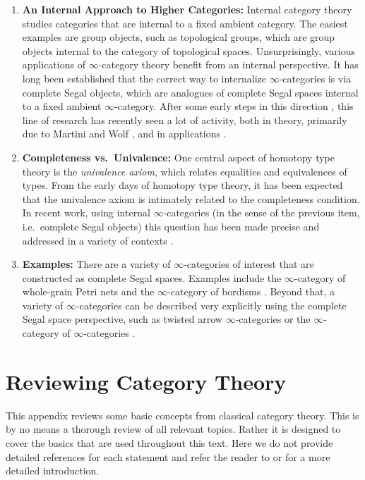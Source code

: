 \documentclass[11pt, a4paper]{amsart}
\theoremstyle{definition}
\theoremstyle{remark}
\numberwithin{equation}{section}
\begin{document}
\begin{enumerate}[leftmargin=*]
  \item \textbf{An Internal Approach to Higher Categories:} Internal category theory studies categories that are internal to a fixed ambient category. The easiest examples are group objects, such as topological groups, which are group objects internal to the category of topological spaces. Unsurprisingly, various applications of $\infty$-category theory benefit from an internal perspective. It has long been established that the correct way to internalize $\infty$-categories is via complete Segal objects, which are analogues of complete Segal spaces internal to a fixed ambient $\infty$-category. After some early steps in this direction \cite{rasekh2018cso,rasekh2022cartesian}, this line of research has recently seen a lot of activity, both in theory, primarily due to Martini and Wolf \cite{martiniwolf2024colimits,martini2021yonedainternal,martini2022cartfibinternal,martiniwolf2022presentability,martiniwolf2023internalhighertopos}, and in applications \cite{wolf2022proetale,stenzel2025comprehension}.     
  \item \textbf{Completeness vs.~Univalence:} One central aspect of homotopy type theory is the \emph{univalence axiom}, which relates equalities and equivalences of types. From the early days of homotopy type theory, it has been expected that the univalence axiom is intimately related to the completeness condition. In recent work, using internal $\infty$-categories (in the sense of the previous item, i.e.~complete Segal objects) this question has been made precise and addressed in a variety of contexts \cite{rasekh2021univalence,stenzel2023univalence}.
  \item \textbf{Examples:} There are a variety of $\infty$-categories of interest that are constructed as complete Segal spaces. Examples include the $\infty$-category of whole-grain Petri nets \cite{kock2023wholegrainpetri} and the $\infty$-category of bordisms \cite{lurie2009cobordism,calaquescheimbauer2019cobordism}. Beyond that, a variety of $\infty$-categories can be described very explicitly using the complete Segal space perspective, such as twisted arrow $\infty$-categories \cite{mukherjeerasekh2022twisted} or the $\infty$-category of $\infty$-categories \cite{rasekh2024model}.
\end{enumerate}
    
\appendix

\section{Reviewing Category Theory} \label{sec:ct}
This appendix reviews some basic concepts from classical category theory. This is by no means a thorough review of all relevant topics. Rather it is designed to cover the basics that are used throughout this text. Here we do not provide detailed references for each statement and refer the reader to \cite[Sections 1--3]{maclane1998categories} or \cite[Chapters 1--3]{riehl2016context} for a more detailed introduction.
\end{document}
